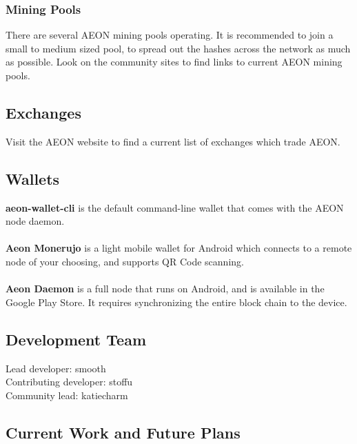 \subsubsection{Mining Pools}
There are several AEON mining pools operating. It is recommended to join a small to medium sized pool, to spread out the hashes across the network as much as possible.  Look on the community sites to find links to current AEON mining pools.

\subsection{Exchanges}
Visit the AEON website to find a current list of exchanges which trade AEON.

\subsection{Wallets}
\textbf{aeon-wallet-cli} is the default command-line wallet that comes with the AEON node daemon.\\
\\
\textbf{Aeon Monerujo} is a light mobile wallet for Android which connects to a remote node of your choosing, and supports QR Code scanning.\\
\\
\textbf{Aeon Daemon} is a full node that runs on Android, and is available in the Google Play Store. It requires synchronizing the entire block chain to the device.\\

\subsection{Development Team}
Lead developer:		smooth\\
Contributing developer:	stoffu\\
Community lead:		katiecharm\\

\subsection{Current Work and Future Plans}
